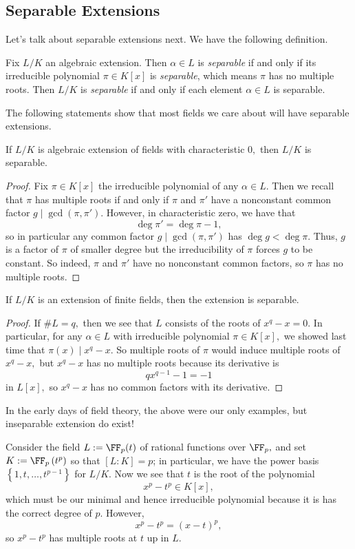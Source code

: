 \documentclass[../notes.tex]{subfiles}
\begin{document}
\subsection{Separable Extensions}
Let's talk about separable extensions next. We have the following definition.
\begin{definition}[Separable]
	Fix $L/K$ an algebraic extension. Then $\alpha\in L$ is \textit{separable} if and only if its irreducible polynomial $\pi\in K[x]$ is \textit{separable}, which means $\pi$ has no multiple roots. Then $L/K$ is \textit{separable} if and only if each element $\alpha\in L$ is separable.
\end{definition}
The following statements show that most fields we care about will have separable extensions.
\begin{exe}
	If $L/K$ is algebraic extension of fields with characteristic $0,$ then $L/K$ is separable.
\end{exe}
\begin{proof}
	Fix $\pi\in K[x]$ the irreducible polynomial of any $\alpha\in L.$ Then we recall that $\pi$ has multiple roots if and only if $\pi$ and $\pi'$ have a nonconstant common factor $g\mid\gcd(\pi,\pi').$ However, in characteristic zero, we have that
	\[\deg\pi'=\deg\pi-1,\]
	so in particular any common factor $g\mid\gcd(\pi,\pi')$ has $\deg g<\deg\pi.$ Thus, $g$ is a factor of $\pi$ of smaller degree but the irreducibility of $\pi$ forces $g$ to be constant. So indeed, $\pi$ and $\pi'$ have no nonconstant common factors, so $\pi$ has no multiple roots.
\end{proof}
\begin{exe}
	If $L/K$ is an extension of finite fields, then the extension is separable.
\end{exe}
\begin{proof}
	If $\#L=q,$ then we see that $L$ consists of the roots of $x^q-x=0.$ In particular, for any $\alpha\in L$ with irreducible polynomial $\pi\in K[x],$ we showed last time that $\pi(x)\mid x^q-x.$ So multiple roots of $\pi$ would induce multiple roots of $x^q-x,$ but $x^q-x$ has no multiple roots because its derivative is
	\[qx^{q-1}-1=-1\]
	in $L[x],$ so $x^q-x$ has no common factors with its derivative.
\end{proof}
In the early days of field theory, the above were our only examples, but inseparable extension do exist!
\begin{nex}
	Consider the field $L:=\FF_p(t)$ of rational functions over $\FF_p,$ and set $K:=\FF_p\left(t^p\right)$ so that $[L:K]=p$; in particular, we have the power basis $\left\{1,t,\ldots,t^{p-1}\right\}$ for $L/K.$ Now we see that $t$ is the root of the polynomial
	\[x^p-t^p\in K[x],\]
	which must be our minimal and hence irreducible polynomial because it is has the correct degree of $p.$ However,
	\[x^p-t^p=(x-t)^p,\]
	so $x^p-t^p$ has multiple roots at $t$ up in $L.$
\end{nex}
\end{document}

